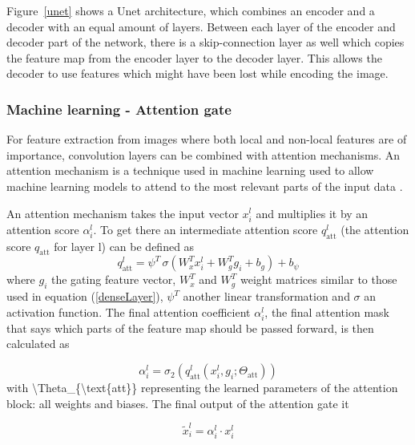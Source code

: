 \documentclass[9pt,Preprint]{lapreprint}
\begin{document}
Figure~\ref{unet} shows a Unet architecture, which combines an encoder and a decoder with an equal amount of layers. Between each layer of the encoder and decoder part of the network, there is a skip-connection layer as well which copies the feature map from the encoder layer to the decoder layer. This allows the decoder to use features which might have been lost while encoding the image.

\subsubsection{Machine learning - Attention gate}

For feature extraction from images where both local and non-local features are of importance, convolution layers can be combined with attention mechanisms. An attention mechanism is a technique used in machine learning used to allow machine learning models to attend to the most relevant parts of the input data \parencite{vaswani2017attention}.

An attention mechanism takes the input vector $x_{i}^{l}$ and multiplies it by an attention score $\alpha_{i}^{l}$. To get there an intermediate attention score $q_{\text{att}}^{l}$ (the attention score $q_{\text{att}}$ for layer l) can be defined as
\begin{equation}
q_{\text{att}}^{l} = \psi^{T} \, \sigma \left( W_{x}^{T} x_{i}^{l} + W_{g}^{T} g_{i} + b_{g} \right) + b_{\psi}
\end{equation}
where $g_{i}$ the gating feature vector, $W_{x}^{T}$ and $W_{g}^{T}$ weight matrices similar to those used in equation (\ref{denseLayer}), $\psi^{T}$ another linear transformation and $\sigma$ an activation function. The final attention coefficient $\alpha_{i}^{l}$, the final attention mask that says which parts of the feature map should be passed forward, is then calculated as

\begin{equation}
\alpha_{i}^{l} = \sigma_{2} \left( q_{\text{att}}^{l}(x_{i}^{l}, g_{i}; \Theta_{\text{att}}) \right)
\end{equation}
with {\textbackslash}Theta\_\{{\textbackslash}text\{att\}\} representing the learned parameters of the attention block: all weights and biases. The final output of the attention gate it

\begin{equation}
\tilde{x}_i^l = \alpha_i^l \cdot x_i^l
\end{equation}
\end{document}
